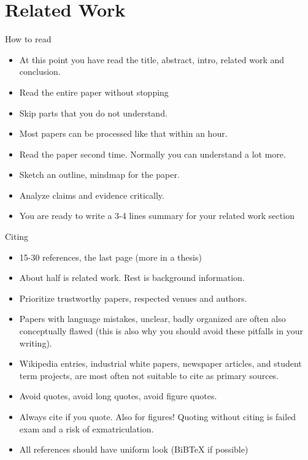 \chapter{Related Work}
How to read
\begin{itemize}
\item At this point you have read the title, abstract, intro, related work and conclusion.
\item Read the entire paper without stopping
\item Skip parts that you do not understand.
\item Most papers can be processed like that within an hour.
\item Read the paper second time. Normally you can understand a lot more.
\item Sketch an outline, mindmap for the paper.
\item Analyze claims and evidence critically.
\item You are ready to write a 3-4 lines summary for your related work section
\end{itemize}

Citing
\begin{itemize}
\item 15-30 references, the last page (more in a thesis)
\item About half is related work. Rest is background information.
\item Prioritize trustworthy papers, respected venues and authors.
\item Papers with language mistakes, unclear, badly organized are often also conceptually flawed (this is also why you should avoid these pitfalls in your writing).
\item Wikipedia entries, industrial white papers, newspaper articles, and student term projects, are most often not suitable to cite as primary sources.
\item Avoid quotes, avoid long quotes, avoid figure quotes.
\item Always cite if you quote. Also for figures! Quoting without citing is failed exam and a risk of exmatriculation.
\item All references should have uniform look (BiBTeX if possible)
\end{itemize}

